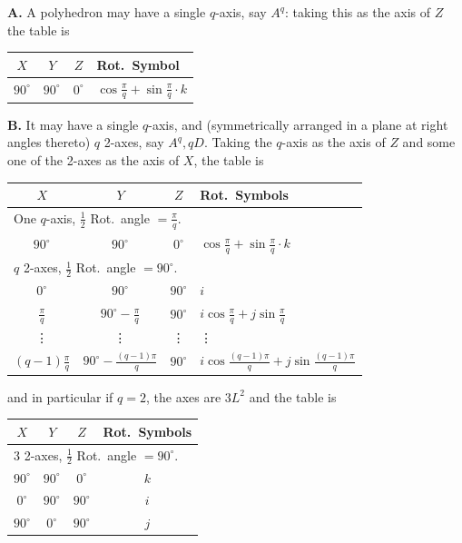 \documentclass[11pt]{article}
\begin{document}
\medskip
\textbf{A.} A polyhedron may have a single $q$-axis, say $A^q$: taking this as the axis of $Z$ the table is
\begin{center}
\begin{tabular}{|c|c|c|l|}\hline
$X$ & $Y$ & $Z$ & Rot.~Symbol \\\hline
$90^\circ$ & $90^\circ$ & $0^\circ$ & $\cos\tfrac{\pi}{q} + \sin\tfrac{\pi}{q}\cdot k$ \\\hline
\end{tabular}
\end{center}

\medskip
\textbf{B.} It may have a single $q$-axis, and (symmetrically arranged in a plane at right angles thereto) $q$ 2-axes, say $A^q, qD$. Taking the $q$-axis as the axis of $Z$ and some one of the 2-axes as the axis of $X$, the table is
\begin{center}
\begin{tabular}{|c|c|c|l|}\hline
$X$ & $Y$ & $Z$ & Rot.~Symbols \\\hline
\multicolumn{4}{|l|}{One $q$-axis, $\tfrac{1}{2}$ Rot.~angle $= \tfrac{\pi}{q}$.} \\
$90^\circ$ & $90^\circ$ & $0^\circ$ & $\cos\tfrac{\pi}{q} + \sin\tfrac{\pi}{q}\cdot k$ \\\hline
\multicolumn{4}{|l|}{$q$ 2-axes, $\tfrac{1}{2}$ Rot.~angle $= 90^\circ$.} \\
$0^\circ$ & $90^\circ$ & $90^\circ$ & $i$ \\
$\tfrac{\pi}{q}$ & $90^\circ - \tfrac{\pi}{q}$ & $90^\circ$ & $i\cos\tfrac{\pi}{q} + j\sin\tfrac{\pi}{q}$ \\
\vdots & \vdots & \vdots & \vdots \\
$(q-1)\tfrac{\pi}{q}$ & $90^\circ - \tfrac{(q-1)\pi}{q}$ & $90^\circ$ & $i\cos\tfrac{(q-1)\pi}{q} + j\sin\tfrac{(q-1)\pi}{q}$ \\\hline
\end{tabular}
\end{center}
and in particular if $q = 2$, the axes are $3L^2$ and the table is
\begin{center}
\begin{tabular}{|c|c|c|c|}\hline
$X$ & $Y$ & $Z$ & Rot.~Symbols \\\hline
\multicolumn{4}{|l|}{3 2-axes, $\tfrac{1}{2}$ Rot.~angle $= 90^\circ$.} \\
$90^\circ$ & $90^\circ$ & $0^\circ$ & $k$ \\
$0^\circ$ & $90^\circ$ & $90^\circ$ & $i$ \\
$90^\circ$ & $0^\circ$ & $90^\circ$ & $j$ \\\hline
\end{tabular}
\end{center}
\end{document}
